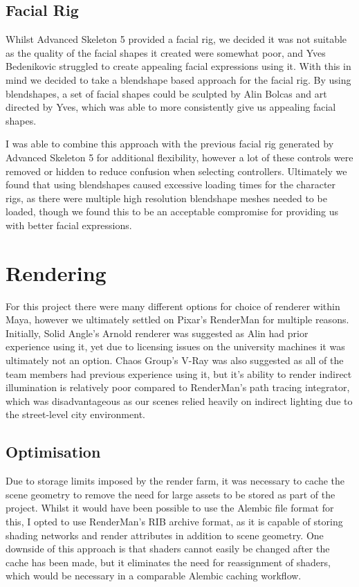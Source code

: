 \documentclass[11pt]{article}
\begin{document}
\subsection{Facial Rig}

Whilst Advanced Skeleton 5 provided a facial rig, we decided it was not suitable as the quality of the facial shapes it created were somewhat poor, and Yves Bedenikovic struggled to create appealing facial expressions using it. With this in mind we decided to take a blendshape based approach for the facial rig. By using blendshapes, a set of facial shapes could be sculpted by Alin Bolcas and art directed by Yves, which was able to more consistently give us appealing facial shapes.

I was able to combine this approach with the previous facial rig generated by Advanced Skeleton 5 for additional flexibility, however a lot of these controls were removed or hidden to reduce confusion when selecting controllers. Ultimately we found that using blendshapes caused excessive loading times for the character rigs, as there were multiple high resolution blendshape meshes needed to be loaded, though we found this to be an acceptable compromise for providing us with better facial expressions.

\newpage

\section{Rendering}

For this project there were many different options for choice of renderer within Maya, however we ultimately settled on Pixar's RenderMan for multiple reasons. Initially, Solid Angle's Arnold renderer was suggested as Alin had prior experience using it, yet due to licensing issues on the university machines it was ultimately not an option. Chaos Group's V-Ray was also suggested as all of the team members had previous experience using it, but it's ability to render indirect illumination is relatively poor compared to RenderMan's path tracing integrator, which was disadvantageous as our scenes relied heavily on indirect lighting due to the street-level city environment.

\subsection{Optimisation} \label{rlslgt}

Due to storage limits imposed by the render farm, it was necessary to cache the scene geometry to remove the need for large assets to be stored as part of the project. Whilst it would have been possible to use the Alembic file format for this, I opted to use RenderMan's RIB archive format, as it is capable of storing shading networks and render attributes in addition to scene geometry. One downside of this approach is that shaders cannot easily be changed after the cache has been made, but it eliminates the need for reassignment of shaders, which would be necessary in a comparable Alembic caching workflow.
\end{document}
